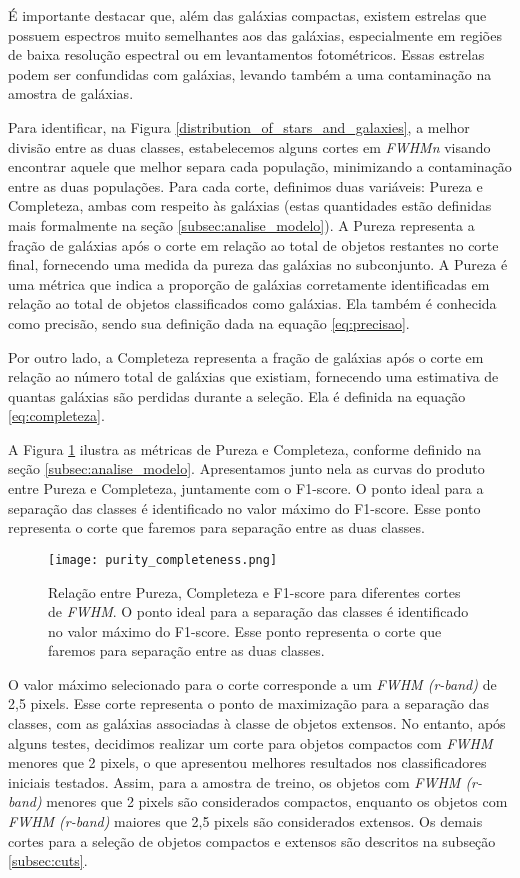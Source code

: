 É importante destacar que, além das galáxias compactas, existem estrelas que possuem espectros muito semelhantes aos das galáxias, especialmente em regiões de baixa resolução espectral ou em levantamentos fotométricos. Essas estrelas podem ser confundidas com galáxias, levando também a uma contaminação na amostra de galáxias.

Para identificar, na Figura \ref{distribution_of_stars_and_galaxies}, a melhor divisão entre as duas classes, estabelecemos alguns cortes em \textit{FWHMn} visando encontrar aquele que melhor separa cada população, minimizando a contaminação entre as duas populações. Para cada corte, definimos duas variáveis: Pureza e Completeza, ambas com respeito às galáxias (estas quantidades estão definidas mais formalmente na seção \ref{subsec:analise_modelo}). A Pureza representa a fração de galáxias após o corte em relação ao total de objetos restantes no corte final, fornecendo uma medida da pureza das galáxias no subconjunto. A Pureza é uma métrica que indica a proporção de galáxias corretamente identificadas em relação ao total de objetos classificados como galáxias. Ela também é conhecida como precisão, sendo sua definição dada na equação \ref{eq:precisao}.

Por outro lado, a Completeza representa a fração de galáxias após o corte em relação ao número total de galáxias que existiam, fornecendo uma estimativa de quantas galáxias são perdidas durante a seleção. Ela é definida na equação \ref{eq:completeza}.

A Figura \ref{purity_completeness} ilustra as métricas de Pureza e Completeza, conforme definido na seção \ref{subsec:analise_modelo}. Apresentamos junto nela as curvas do produto entre Pureza e Completeza, juntamente com o F1-score. O ponto ideal para a separação das classes é identificado no valor máximo do F1-score. Esse ponto representa o corte que faremos para separação entre as duas classes.

\begin{figure}[!ht]
    \centering
    \texttt{[image: purity\_completeness.png]}
    \caption[]{Relação entre Pureza, Completeza e F1-score para diferentes cortes de \textit{FWHM}. O ponto ideal para a separação das classes é identificado no valor máximo do F1-score. Esse ponto representa o corte que faremos para separação entre as duas classes.}
    \label{purity_completeness}
\end{figure}

O valor máximo selecionado para o corte corresponde a um \textit{FWHM (r-band)} de 2,5 pixels. Esse corte representa o ponto de maximização para a separação das classes, com as galáxias associadas à classe de objetos extensos. No entanto, após alguns testes, decidimos realizar um corte para objetos compactos com \textit{FWHM} menores que 2 pixels, o que apresentou melhores resultados nos classificadores iniciais testados. Assim, para a amostra de treino, os objetos com \textit{FWHM (r-band)} menores que 2 pixels são considerados compactos, enquanto os objetos com \textit{FWHM (r-band)} maiores que 2,5 pixels são considerados extensos. Os demais cortes para a seleção de objetos compactos e extensos são descritos na subseção \ref{subsec:cuts}.

